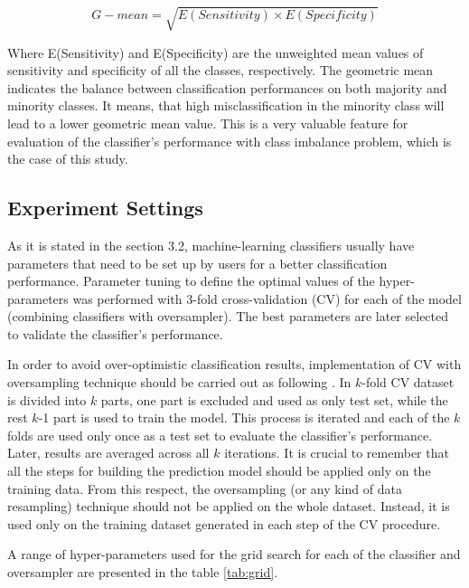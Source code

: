 \documentclass[parskip=full]{scrartcl}
\begin{document}
\begin{itemize}
	\begin{equation}
	G{-}mean = \sqrt{E(Sensitivity) \times E(Specificity)}
	\end{equation}

	Where E(Sensitivity) and E(Specificity) are the unweighted mean values of
	sensitivity and specificity of all the classes, respectively. The geometric
	mean indicates the balance between classification performances on both
	majority and minority classes. It means, that high misclassification in the
	minority class will lead to a lower geometric mean value. This is a very
	valuable feature for evaluation of the classifier's performance with class
	imbalance problem, which is the case of this study.

\end{itemize}

\subsection{Experiment Settings}

As it is stated in the section 3.2, machine-learning classifiers usually have
parameters that need to be set up by users for a better classification
performance. Parameter tuning to define the optimal values of the
hyper-parameters was performed with 3-fold cross-validation (CV) for each of the
model (combining classifiers with oversampler). The best parameters are later
selected to validate the classifier's performance.

In order to avoid over-optimistic classification results, implementation of CV
with oversampling technique should be carried out as following \cite{Lusa2015}.
In $k$-fold CV dataset is divided into $k$ parts, one part is excluded and used
as only test set, while the rest $k$-1 part is used to train the model. This
process is iterated and each of the $k$ folds are used only once as a test set
to evaluate the classifier's performance. Later, results are averaged across all
$k$ iterations. It is crucial to remember that all the steps for building the
prediction model should be applied only on the training data. From this respect,
the oversampling (or any kind of data resampling) technique should not be
applied on the whole dataset. Instead, it is used only on the training dataset
generated in each step of the CV procedure.

A range of hyper-parameters used for the grid search for each of the classifier
and oversampler are presented in the table \ref{tab:grid}.
\end{document}
